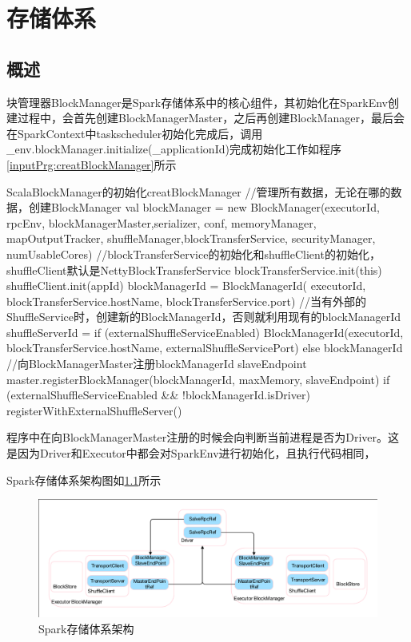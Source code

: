 \chapter{存储体系}
\section{概述}
块管理器BlockManager是Spark存储体系中的核心组件，其初始化在SparkEnv创建过程中，会首先创建BlockManagerMaster，之后再创建BlockManager，最后会在SparkContext中taskscheduler初始化完成后，调用\_env.blockManager.initialize(\_applicationId)完成初始化工作如程序\ref{inputPrg:creatBlockManager}所示
\begin{codeInput}{Scala}{BlockManager的初始化}{creatBlockManager}
//管理所有数据，无论在哪的数据，创建BlockManager
val blockManager = new BlockManager(executorId, rpcEnv, blockManagerMaster,serializer, conf, memoryManager, mapOutputTracker, shuffleManager,blockTransferService, securityManager, numUsableCores)
//blockTransferService的初始化和shuffleClient的初始化，shuffleClient默认是NettyBlockTransferService
blockTransferService.init(this)
shuffleClient.init(appId)
blockManagerId = BlockManagerId(
executorId, blockTransferService.hostName, blockTransferService.port)
//当有外部的ShuffleService时，创建新的BlockManagerId，否则就利用现有的blockManagerId
shuffleServerId = if (externalShuffleServiceEnabled) {
  BlockManagerId(executorId, blockTransferService.hostName, externalShuffleServicePort)
} else {
  blockManagerId
}
//向BlockManagerMaster注册blockManagerId slaveEndpoint
  master.registerBlockManager(blockManagerId, maxMemory, slaveEndpoint)
if (externalShuffleServiceEnabled && !blockManagerId.isDriver) {
  registerWithExternalShuffleServer()
}
\end{codeInput}

程序中在向BlockManagerMaster注册的时候会向判断当前进程是否为Driver。这是因为Driver和Executor中都会对SparkEnv进行初始化，且执行代码相同，

Spark存储体系架构图如\ref{fig:SparkArc}所示
\begin{figure}[H] 
	\centering
	\includegraphics[width=\textwidth]{figures/storage.pdf}
	\caption{Spark存储体系架构}
	\label{fig:SparkArc}
\end{figure}

